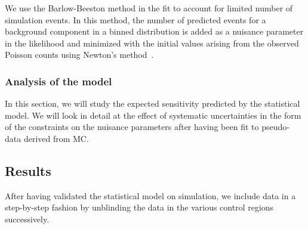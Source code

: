 We use the Barlow-Beeston method in the fit to account for limited number of simulation events. In this method, the number of predicted events for a background component in a binned distribution is added as a nuisance parameter in the likelihood and minimized with the initial values arising from the observed Poisson counts using Newton's method~\cite{Barlow:1993dm}. 

\subsubsection{Analysis of the model}
In this section, we will study the expected sensitivity predicted by the statistical model. We will look in detail at the effect of systematic uncertainties in the form of the constraints on the nuisance parameters after having been fit to pseudo-data derived from MC.

\subsection{Results}
After having validated the statistical model on simulation, we include data in a step-by-step fashion by unblinding the data in the various control regions successively.
